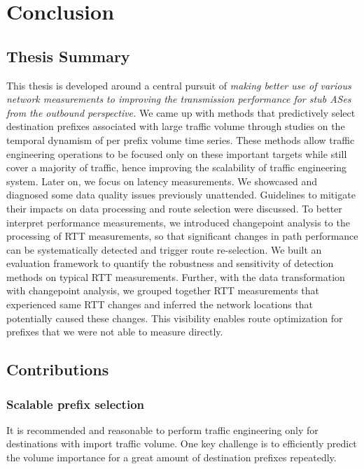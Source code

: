 \chapter{Conclusion}

\section{Thesis Summary}

This thesis is developed around a central pursuit of \textit{making better use of various network measurements to improving the transmission performance for stub ASes from the outbound perspective.}
We came up with methods that predictively select destination prefixes associated with large traffic volume through studies on the temporal dynamism of per prefix volume time series.
These methods allow traffic engineering operations to be focused only on these important targets while still cover a majority of traffic, hence improving the scalability of traffic engineering system.
Later on, we focus on latency measurements. 
We showcased and diagnosed some data quality issues previously unattended.
Guidelines to mitigate their impacts on data processing and route selection were discussed.
To better interpret performance measurements, we introduced changepoint analysis to the processing of RTT measurements, so that significant changes in path performance can be systematically detected and trigger route re-selection.
We built an evaluation framework to quantify the robustness and sensitivity of detection methods on typical RTT measurements.
Further, with the data transformation with changepoint analysis, we grouped together RTT measurements that experienced same RTT changes and inferred the network locations that potentially caused these changes. This visibility enables route optimization for prefixes that we were not able to measure directly.

\section{Contributions}

\subsection{Scalable prefix selection}
It is recommended and reasonable to perform traffic engineering only for destinations with import traffic volume. One key challenge is to efficiently predict the volume importance for a great amount of destination prefixes repeatedly.

